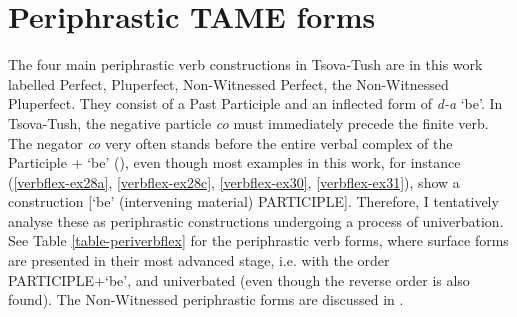 \section{Periphrastic TAME forms} \label{periph}

The four main periphrastic verb constructions in Tsova-Tush are in this work labelled Perfect, Pluperfect, Non-Witnessed Perfect, the Non-Witnessed Pluperfect. They consist of a Past Participle and an inflected form of \textit{d-a} `be'. In Tsova-Tush, the negative particle \textit{co} must immediately precede the finite verb. The negator \textit{co} very often stands before the entire verbal complex of the Participle + `be' (\cites{ankernegation}), even though most examples in this work, for instance (\ref{verbflex-ex28a}, \ref{verbflex-ex28c}, \ref{verbflex-ex30}, \ref{verbflex-ex31}), show a construction [`be' (intervening material) PARTICIPLE]. Therefore, I tentatively analyse these as periphrastic constructions undergoing a process of univerbation. See Table \ref{table-periverbflex} for the periphrastic verb forms, where surface forms are presented in their most advanced stage, i.e. with the order PARTICIPLE+`be', and univerbated (even though the reverse order is also found). The Non-Witnessed periphrastic forms are discussed in .


